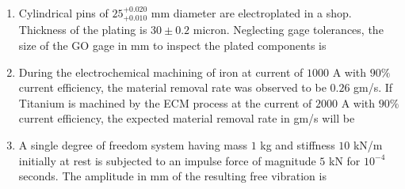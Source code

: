 \documentclass[journal]{IEEEtran}
\begin{document}
\begin{enumerate}[leftmargin=0pt]
\item Cylindrical pins of $25^{+0.020}_{+0.010}$ mm diameter are electroplated in a shop. Thickness of the plating is $30 \pm 0.2$ micron. Neglecting gage tolerances, the size of the GO gage in mm to inspect the plated components is
\begin{enumerate}
\end{enumerate}
\hfill{}

\item During the electrochemical machining  of iron  at current of $1000$ A with $90\%$ current efficiency, the material removal rate was observed to be $0.26$ gm/s. If Titanium  is machined by the ECM process at the current of $2000$ A with $90\%$ current efficiency, the expected material removal rate in gm/s will be
\begin{enumerate}
\end{enumerate}
\hfill{}

\item A single degree of freedom system having mass $1$ kg and stiffness $10$ kN/m initially at rest is subjected to an impulse force of magnitude $5$ kN for $10^{-4}$ seconds. The amplitude in mm of the resulting free vibration is
\begin{enumerate}
\end{enumerate}
\hfill{}


\end{enumerate}
\end{document}
